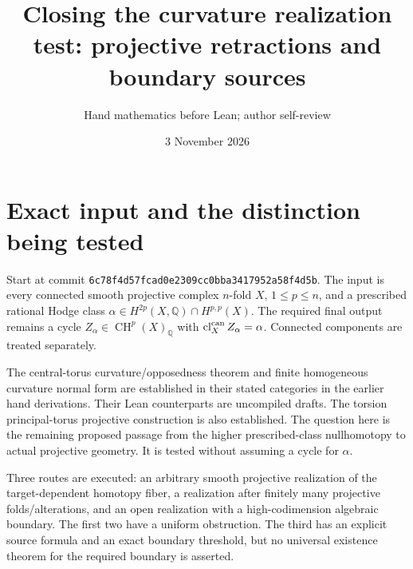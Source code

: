 \documentclass[11pt]{article}
\title{Closing the curvature realization test: projective retractions and boundary sources}
\author{Hand mathematics before Lean; author self-review}
\date{3 November 2026}
\newcommand{\Q}{\mathbb Q}
\newcommand{\CH}{\operatorname{CH}}
\newcommand{\cl}{\operatorname{cl}^{\rm can}}
\begin{document}
\maketitle

\section{Exact input and the distinction being tested}
Start at commit \texttt{6c78f4d57fcad0e2309cc0bba3417952a58f4d5b}.
The input is every connected smooth projective complex $n$-fold $X$,
$1\le p\le n$, and a prescribed rational Hodge class
$\alpha\in H^{2p}(X,\Q)\cap H^{p,p}(X)$.
The required final output remains a cycle $Z_\alpha\in\CH^p(X)_\Q$
with $\cl_X Z_\alpha=\alpha$. Connected components are treated separately.

The central-torus curvature/opposedness theorem and finite homogeneous
curvature normal form are established in their stated categories in the
earlier hand derivations. Their Lean counterparts are uncompiled drafts.
The torsion principal-torus projective construction is also established.
The question here is the remaining proposed passage from the higher
prescribed-class nullhomotopy to actual projective geometry. It is tested
without assuming a cycle for $\alpha$.

Three routes are executed: an arbitrary smooth projective realization of
the target-dependent homotopy fiber, a realization after finitely many
projective folds/alterations, and an open realization with a high-codimension
algebraic boundary. The first two have a uniform obstruction. The third
has an explicit source formula and an exact boundary threshold, but no
universal existence theorem for the required boundary is asserted.
\end{document}

